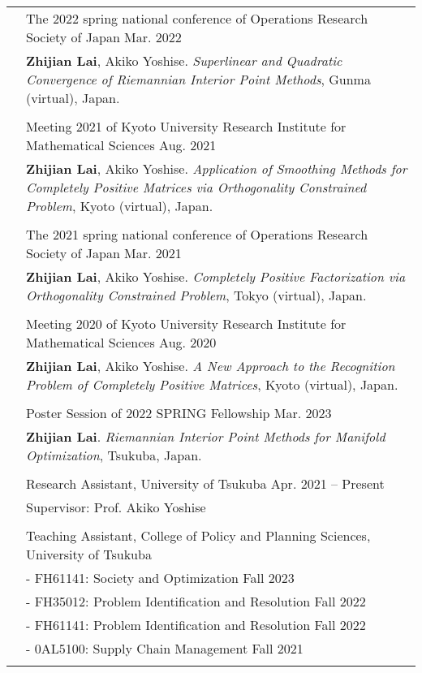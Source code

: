 \documentclass[a4paper,10pt]{article}
\newcommand{\lefttitle}[1]{\color{black}{\textsc{#1}}}
\begin{document}
\begin{longtable}{p{30mm}p{140mm}}
		& {The 2022 spring national conference of Operations Research Society of Japan} \hfill Mar. 2022 \\
		& \textbf{Zhijian Lai}, Akiko Yoshise. \textit{Superlinear and Quadratic Convergence of Riemannian Interior Point Methods}, Gunma (virtual), Japan. \\
		& \\

		& {Meeting 2021 of Kyoto University Research Institute for Mathematical Sciences} \hfill Aug. 2021 \\
		& \textbf{Zhijian Lai}, Akiko Yoshise. \textit{Application of Smoothing Methods for Completely Positive Matrices via Orthogonality Constrained Problem}, Kyoto (virtual), Japan. \\
		& \\
		
		& {The 2021 spring national conference of Operations Research Society of Japan} \hfill Mar. 2021 \\
		& \textbf{Zhijian Lai}, Akiko Yoshise. \textit{Completely Positive Factorization via Orthogonality Constrained Problem}, Tokyo (virtual), Japan. \\
		& \\

		& {Meeting 2020 of Kyoto University Research Institute for Mathematical Sciences} \hfill Aug. 2020 \\
		& \textbf{Zhijian Lai}, Akiko Yoshise. \textit{A New Approach to the Recognition Problem of Completely Positive Matrices}, Kyoto (virtual), Japan. \\
		& \\

		\nohyphens{\lefttitle{Poster}} 
		& {Poster Session of 2022 SPRING Fellowship} \hfill Mar. 2023 \\
		& \textbf{Zhijian Lai}. \textit{Riemannian Interior Point Methods for Manifold Optimization}, Tsukuba, Japan. \\
		& \\

		\nohyphens{\lefttitle{Research}} 
		& {Research Assistant, University of Tsukuba} \hfill Apr. 2021 -- Present \\
		\nohyphens{\lefttitle{Experience}}
		& Supervisor: Prof. Akiko Yoshise \\
		& \\
				
		\nohyphens{\lefttitle{Teaching}} 
		& {Teaching Assistant, College of Policy and Planning Sciences, University of Tsukuba}  \\
		\nohyphens{\lefttitle{Experience}} 
		& - FH61141: Society and Optimization \hfill Fall 2023 \\
		& - FH35012: Problem Identification and Resolution \hfill Fall 2022 \\
		& - FH61141: Problem Identification and Resolution \hfill Fall 2022 \\
		& - 0AL5100: Supply Chain Management \hfill Fall 2021  \\
		& \\
		

\end{longtable}
\end{document}
